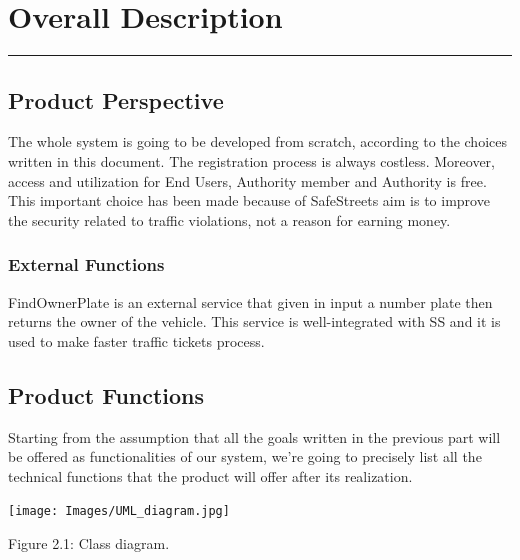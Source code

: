 \documentclass[12pt]{article}
\begin{document}
\newpage

\section{Overall Description}
\hrule
\vspace{8mm}

\subsection{Product Perspective}
\vspace{5mm}

The whole system is going to be developed from scratch, according to the choices written in this document. The registration process is always costless. Moreover, access and utilization for End Users, Authority member and Authority is free. This important choice has been made because of SafeStreets aim is to improve the security related to traffic violations, not a reason for earning money. 

\subsubsection{External Functions}
\vspace{2mm}

FindOwnerPlate is an external service that given in input a number plate then returns the owner of the vehicle. This service is well-integrated with SS and it is used to make faster traffic tickets process. 


\subsection{Product Functions}
Starting from the assumption that all the goals written in the previous part will be offered as functionalities of our system, we’re going to precisely list all the technical functions that the product will offer after its realization. 

\newpage
\begin{flushleft}

\texttt{[image: Images/UML\_diagram.jpg]}

Figure 2.1: Class diagram.
\end{flushleft}
\newpage
\end{document}
